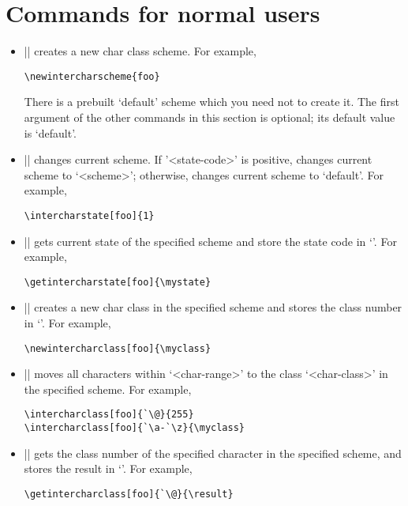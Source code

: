 \documentclass{article}
\begin{document}
\section{Commands for normal users}

\begin{itemize}
  \item || creates a new char class scheme. For example,
        \begin{verbatim}\newintercharscheme{foo}\end{verbatim}
        There is a prebuilt `default' scheme which you need not to create it.
        The first argument of the other commands in this section is optional;
        its default value is `default'.
  \item || changes current scheme.
        If '<state-code>' is positive, changes current scheme to `<scheme>';
        otherwise, changes current scheme to `default'. For example,
        \begin{verbatim}\intercharstate[foo]{1}\end{verbatim}
  \item |\getintercharstate[<scheme>]{\cs}| gets current state of the specified scheme
        and store the state code in `\cs'. For example,
        \begin{verbatim}\getintercharstate[foo]{\mystate}\end{verbatim}
  \item |\newintercharclass[<scheme>]{\cs}| creates a new char class in the specified scheme
        and stores the class number in `\cs'. For example,
        \begin{verbatim}\newintercharclass[foo]{\myclass}\end{verbatim}
  \item || moves all characters within
        `<char-range>' to the class `<char-class>' in the specified scheme. For example,
\begin{verbatim}
\intercharclass[foo]{`\@}{255}
\intercharclass[foo]{`\a-`\z}{\myclass}
\end{verbatim}
  \item || gets the class number of the specified
        character in the specified scheme, and stores the result in `\cs'. For example,
        \begin{verbatim}\getintercharclass[foo]{`\@}{\result}\end{verbatim}

\end{itemize}
\end{document}

